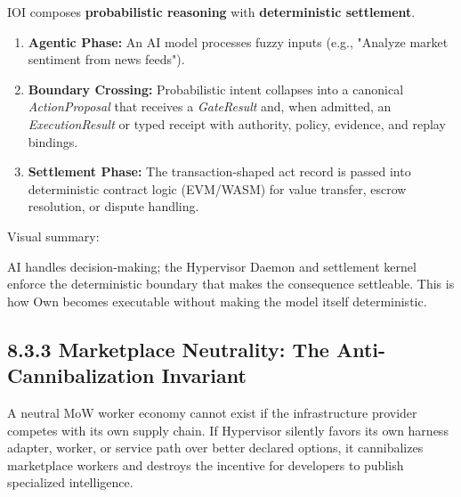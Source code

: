 \documentclass[
  11pt,
]{article}
\providecommand{\tightlist}{%
  \setlength{\itemsep}{0pt}\setlength{\parskip}{0pt}}
\begin{document}
IOI composes \textbf{probabilistic reasoning} with \textbf{deterministic
settlement}.

\begin{enumerate}
\def\labelenumi{\arabic{enumi}.}
\tightlist
\item
  \textbf{Agentic Phase: }An AI model processes fuzzy inputs (e.g.,
  "Analyze market sentiment from news feeds").
\item
  \textbf{Boundary Crossing:} Probabilistic intent collapses into a
  canonical \emph{ActionProposal} that receives a \emph{GateResult} and,
  when admitted, an \emph{ExecutionResult} or typed receipt with authority,
  policy, evidence, and replay bindings.
\item
  \textbf{Settlement Phase:} The transaction-shaped act record is passed
  into deterministic contract logic (EVM/WASM) for value transfer,
  escrow resolution, or dispute handling.
\end{enumerate}

Visual summary:


\begin{center}
\end{center}

AI handles decision-making; the Hypervisor Daemon and settlement kernel
enforce the deterministic boundary that makes the consequence
settleable. This is how Own becomes executable without making the model
itself deterministic.

\hypertarget{marketplace-neutrality-the-anti-cannibalization-invariant}{%
\subsection{8.3.3 Marketplace Neutrality: The Anti-Cannibalization
Invariant}\label{marketplace-neutrality-the-anti-cannibalization-invariant}}

A neutral MoW worker economy cannot exist if the infrastructure provider
competes with its own supply chain. If Hypervisor silently favors its own
harness adapter, worker, or service path over better declared options, it
cannibalizes marketplace workers and destroys the incentive for
developers to publish specialized intelligence.
\end{document}
